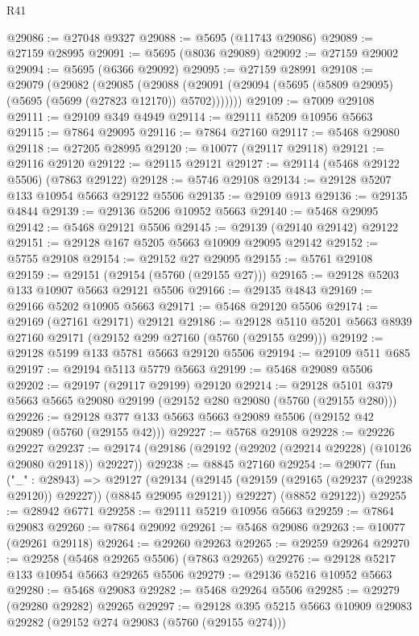 \begin{lexlean}{R41}
\begin{coremodule}
@29086 := @27048 @9327
@29088 := @5695 (@11743 @29086)
@29089 := @27159 @28995
@29091 := @5695 (@8036 @29089)
@29092 := @27159 @29002
@29094 := @5695 (@6366 @29092)
@29095 := @27159 @28991
@29108 := @29079
    (@29082
      (@29085
        (@29088 (@29091 (@29094 (@5695 (@5809 @29095) (@5695 (@5699 (@27823 @12170)) @5702)))))))
@29109 := @7009 @29108
@29111 := @29109 @349 @4949
@29114 := @29111 @5209 @10956 @5663
@29115 := @7864 @29095
@29116 := @7864 @27160
@29117 := @5468 @29080
@29118 := @27205 @28995
@29120 := @10077 (@29117 @29118)
@29121 := @29116 @29120
@29122 := @29115 @29121
@29127 := @29114 (@5468 @29122 @5506) (@7863 @29122)
@29128 := @5746 @29108
@29134 := @29128 @5207 @133 @10954 @5663 @29122 @5506
@29135 := @29109 @913
@29136 := @29135 @4844
@29139 := @29136 @5206 @10952 @5663
@29140 := @5468 @29095
@29142 := @5468 @29121 @5506
@29145 := @29139 (@29140 @29142) @29122
@29151 := @29128 @167 @5205 @5663 @10909 @29095 @29142
@29152 := @5755 @29108
@29154 := @29152 @27 @29095
@29155 := @5761 @29108
@29159 := @29151 (@29154 (@5760 (@29155 @27)))
@29165 := @29128 @5203 @133 @10907 @5663 @29121 @5506
@29166 := @29135 @4843
@29169 := @29166 @5202 @10905 @5663
@29171 := @5468 @29120 @5506
@29174 := @29169 (@27161 @29171) @29121
@29186 := @29128 @5110 @5201 @5663 @8939 @27160 @29171 (@29152 @299 @27160 (@5760 (@29155 @299)))
@29192 := @29128 @5199 @133 @5781 @5663 @29120 @5506
@29194 := @29109 @511 @685
@29197 := @29194 @5113 @5779 @5663
@29199 := @5468 @29089 @5506
@29202 := @29197 (@29117 @29199) @29120
@29214 := @29128 @5101 @379 @5663 @5665 @29080 @29199 (@29152 @280 @29080 (@5760 (@29155 @280)))
@29226 := @29128 @377 @133 @5663 @5663 @29089 @5506 (@29152 @42 @29089 (@5760 (@29155 @42)))
@29227 := @5768 @29108
@29228 := @29226 @29227
@29237 := @29174 (@29186 (@29192 (@29202 (@29214 @29228) (@10126 @29080 @29118)) @29227))
@29238 := @8845 @27160
@29254 := @29077
    (fun ("_" : @28943) =>
    @29127
      (@29134
        (@29145 (@29159 (@29165 (@29237 (@29238 @29120)) @29227)) (@8845 @29095 @29121))
        @29227)
      (@8852 @29122))
@29255 := @28942 @6771
@29258 := @29111 @5219 @10956 @5663
@29259 := @7864 @29083
@29260 := @7864 @29092
@29261 := @5468 @29086
@29263 := @10077 (@29261 @29118)
@29264 := @29260 @29263
@29265 := @29259 @29264
@29270 := @29258 (@5468 @29265 @5506) (@7863 @29265)
@29276 := @29128 @5217 @133 @10954 @5663 @29265 @5506
@29279 := @29136 @5216 @10952 @5663
@29280 := @5468 @29083
@29282 := @5468 @29264 @5506
@29285 := @29279 (@29280 @29282) @29265
@29297 := @29128 @395 @5215 @5663 @10909 @29083 @29282 (@29152 @274 @29083 (@5760 (@29155 @274)))

\end{coremodule}
\end{lexlean}
